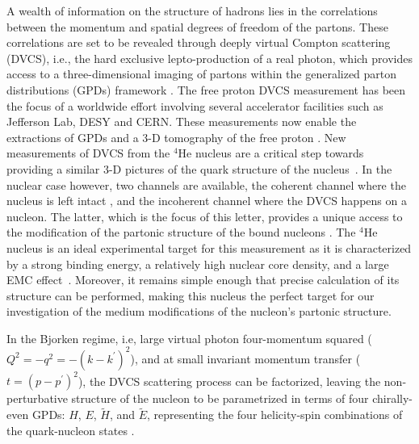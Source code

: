 \documentclass[twocolumn,nofootinbib,showpacs,prl,superscriptaddress,secnumarabic,amssymb,nobibnotes,aps,floatfix]{revtex4}
\begin{document}
A wealth of information on the structure of hadrons lies in the correlations 
between the momentum and spatial degrees of freedom of the partons. These 
correlations are set to be revealed through deeply virtual Compton scattering 
(DVCS), i.e., the hard exclusive lepto-production of a real photon, which 
provides access to a three-dimensional imaging of partons within the 
generalized parton distributions (GPDs) framework 
\cite{Mueller:1998fv,Ji:1996ek,Ji:1996nm,Radyushkin:1996nd,Radyushkin:1997ki}.   
The free proton DVCS measurement has been the focus of a worldwide effort 
\cite{Stepanyan:2001sm,Airapetian:2001yk,Airapetian:2006zr,Chekanov:2003ya,Aktas:2005ty,Chen:2006na,Munoz 
Camacho:2006hx,Girod:2007aa,Mazouz:2007aa,Gavalian:2009,Seder:2015,Pisano:2015,Jo:2015ema}
involving several accelerator facilities such as Jefferson Lab, DESY and  
CERN. These measurements now enable the extractions of GPDs 
and a 3-D tomography of the free proton \cite{Guidal:2013rya,Dupre:2016mai}.  
New measurements of DVCS from the $^{4}$He nucleus are a critical 
step towards providing a similar 3-D pictures of the quark structure of the 
nucleus~\cite{Dupre:2015jha}. In the nuclear case however, two channels are available,
the coherent channel where the nucleus is left intact \cite{Airapetian:2009cga,
Hattawy:2017woc}, and the incoherent channel where the DVCS happens on a nucleon.
The latter, which is the focus of this letter, provides a unique access to the 
modification of the partonic structure of the bound nucleons 
\cite{simonetta_2,Guzey:2006xi,Guzey:2008fe}. The 
$^{4}$He nucleus is an ideal experimental target for this measurement as it is 
characterized by a strong binding energy, a relatively high nuclear 
core density, and a large EMC effect~\cite{JSeely}. Moreover, it remains simple 
enough that precise calculation of its structure 
can be performed, making this nucleus the perfect target for our investigation of the 
medium modifications of the nucleon's partonic structure. 


In the 
Bjorken regime, i.e, large virtual photon four-momentum squared 
($Q^{2}=-q^2=-(k-k^\prime)^2$), and at small invariant momentum transfer ($t=(p-p^\prime)^2$), the 
DVCS scattering process can be factorized, leaving the non-perturbative structure 
of the nucleon to be parametrized in terms of four chirally-even GPDs: $H$, 
$E$, $\widetilde{H}$, and $\widetilde{E}$, representing the four helicity-spin 
combinations of the quark-nucleon states \cite{Freund_Collins,Ji_Osborne}.
\end{document}
